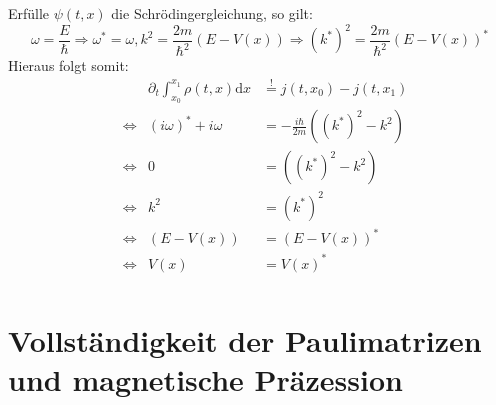 \documentclass[a4paper,11pt]{article}
\begin{document}
Erfülle $\psi(t, x)$ die Schrödingergleichung, so gilt:
\begin{equation}
        \omega = \frac{E}{\hbar} \Rightarrow \omega^* = \omega, k^2 = \frac{2m}{\hbar^2}(E-V(x)) \Rightarrow (k^*)^2 = \frac{2m}{\hbar^2}(E-V(x))^*
\end{equation}
Hieraus folgt somit:
\begin{equation}
        \begin{aligned}
                &                 & \partial_t \int_{x_0}^{x_1} \rho(t, x)\text{d}x & \overset{!}{=} j(t, x_0) - j(t, x_1) \\
                & \Leftrightarrow & (i\omega)^* + i\omega                           & = -\frac{i\hbar}{2m}((k^*)^2 - k^2) \\
                & \Leftrightarrow & 0                                               & = ((k^*)^2 - k^2) \\
                & \Leftrightarrow & k^2                                             & = (k^*)^2 \\
                & \Leftrightarrow & (E-V(x))                                        & = (E-V(x))^* \\
                & \Leftrightarrow & V(x)                                            & = V(x)^* \\
        \end{aligned}
\end{equation}

\section{Vollständigkeit der Paulimatrizen und magnetische Präzession}
\end{document}
